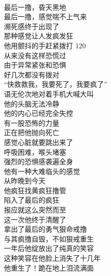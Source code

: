 \begin{poem}[从疯撸到狠戒]
    \begin{multicols}{3}
        \centering~\\
        最后一撸，昏天黑地 \\ 最后一撸，感觉喘不上气来 \\ 濒死感终于出现了 \\ 那种感觉让人发疯发狂 \\ 他用颤抖的手赶紧拨打 120 \\ 从来没有这样恐慌过 \\ 由于异常紧张和恐惧 \\ 好几次都没有拨对 \\ “快救救我，我要死了，我要疯了” \\ 语无伦次地对着手机大喊大叫 \\ 他的头脑无法冷静 \\ 他的内心已经完全失控 \\ 有一股恐怖的力量 \\ 正在把他抛向死亡 \\ 感觉心脏就要跳出来了 \\ 呼吸困难，喉头堵塞 \\ 强烈的恐惧感袭遍全身 \\ 他有一种大难临头的感觉 \\ 从昨晚到今天 \\ 他疯狂找黄疯狂撸管 \\ 陷入了最后的疯狂 \\ 报应就这么突然而至 \\ 这一次他终于清醒了 \\ 拿出了最后的勇气狠命戒撸 \\ 与其疯撸自毁，不如狠戒重生 \\ 一年后他绽放出了纯真的笑容 \\ 这种笑容在他脸上消失了十几年 \\ 他重生了！跪在地上泪流满面
    \end{multicols}
\end{poem}

